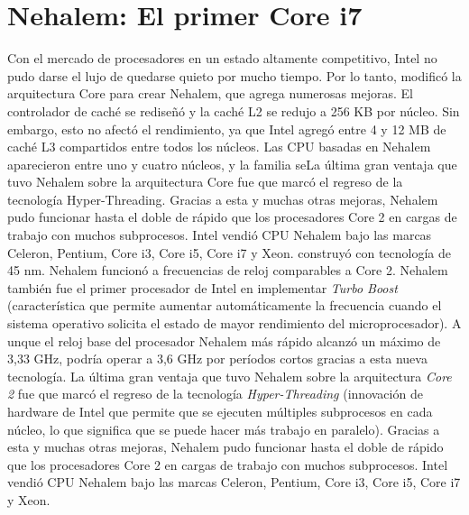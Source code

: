 \section{Nehalem: El primer Core i7}
Con el mercado de procesadores en un estado altamente competitivo, Intel no pudo darse el lujo de quedarse quieto por mucho tiempo. 
Por lo tanto, modificó la arquitectura Core para crear Nehalem, que agrega numerosas mejoras. El controlador de caché se rediseñó y 
la caché L2 se redujo a 256 KB por núcleo. Sin embargo, esto no afectó el rendimiento, ya que Intel agregó entre 4 y 12 MB de caché L3 
compartidos entre todos los núcleos. Las CPU basadas en Nehalem aparecieron entre uno y cuatro núcleos, y la familia seLa última gran ventaja que tuvo Nehalem sobre la arquitectura Core fue que marcó el regreso de la tecnología Hyper-Threading. Gracias a esta y muchas otras mejoras, Nehalem pudo funcionar hasta el doble de rápido que los procesadores Core 2 en cargas de trabajo con muchos subprocesos. Intel vendió CPU Nehalem bajo las marcas Celeron, Pentium, Core i3, Core i5, Core i7 y Xeon. construyó 
con tecnología de 45 nm.
Nehalem funcionó a frecuencias de reloj comparables a Core 2. 
Nehalem también fue el primer procesador de Intel en implementar \emph{Turbo Boost} (característica que permite aumentar automáticamente la frecuencia 
cuando el sistema operativo solicita el estado de mayor rendimiento del microprocesador). A
unque el reloj base del procesador Nehalem más rápido alcanzó un máximo de 3,33 GHz, podría operar a 3,6 GHz por períodos cortos gracias a esta 
nueva tecnología. La última gran ventaja que tuvo Nehalem sobre la arquitectura \emph{Core 2} fue que marcó el regreso de la tecnología \emph{Hyper-Threading}
(innovación de hardware de Intel que permite que se ejecuten múltiples subprocesos en cada núcleo, lo que significa que se puede hacer más trabajo en paralelo). 
Gracias a esta y muchas otras mejoras, Nehalem pudo funcionar hasta el doble de rápido que los procesadores Core 2 en cargas de trabajo con muchos subprocesos. Intel vendió CPU Nehalem bajo las marcas Celeron, Pentium, Core i3, Core i5, Core i7 y Xeon.

